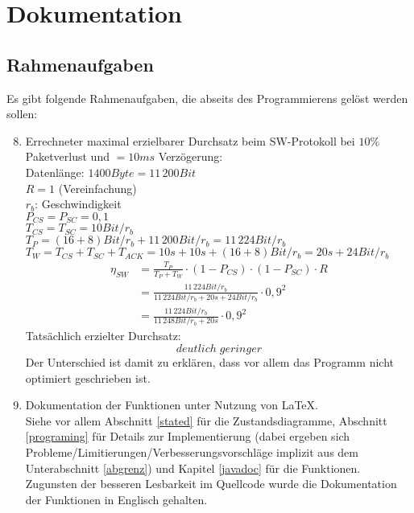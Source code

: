 \maketitle
\newpage
\tableofcontents
\newpage

\chapter{Dokumentation}

\section{Rahmenaufgaben}

Es gibt folgende Rahmenaufgaben, die abseits des Programmierens gelöst werden sollen:
\begin{enumerate}
\setcounter{enumi}{7}
\item Errechneter maximal erzielbarer Durchsatz beim SW-Protokoll bei $10\%$ Paketverlust und $=10\unit{ms}$ Verzögerung:\\
Datenlänge: $1400 \unit{Byte} = 11\,200\unit{Bit}$\\
$R=1$ (Vereinfachung)\\
$r_b$: Geschwindigkeit\\
$P_{CS}=P_{SC}=0,1$\\
$T_{CS}=T_{SC}=10\unit{Bit}/r_b$\\
$T_P=(16+8)\unit{Bit}/r_b+11\,200\unit{Bit}/r_b=11\,224\unit{Bit}/r_b$ \\
$T_W=T_{CS}+T_{SC}+T_{ACK}=10\unit{s}+10\unit{s}+(16+8)\unit{Bit}/r_b=20\unit{s}+24\unit{Bit}/r_b$
\begin{align*}
\eta_{SW}&=\frac{T_P}{T_P+ T_W}\cdot (1-P_{CS})\cdot(1-P_{SC}) \cdot R \\
&= \frac{11\,224\unit{Bit}/r_b}{11\,224\unit{Bit}/r_b+20\unit{s}+24\unit{Bit}/r_b}\cdot 0,9^2\\
&=\frac{11\,224\unit{Bit}/r_b}{11\,248\unit{Bit}/r_b+20\unit{s}}\cdot 0,9^2
\end{align*}
Tatsächlich erzielter Durchsatz:
$$deutlich\;geringer$$
Der Unterschied ist damit zu erklären, dass vor allem das Programm nicht optimiert geschrieben ist.
\item Dokumentation der Funktionen unter Nutzung von \LaTeX{}.\\
Siehe vor allem Abschnitt \ref{stated} für die Zustandsdiagramme, Abschnitt \ref{programing} für Details zur Implementierung (dabei ergeben sich Probleme/Limitierungen/Verbesserungsvorschläge implizit aus dem Unterabschnitt \ref{abgrenz})  und Kapitel \ref{javadoc} für die Funktionen. Zugunsten der besseren Lesbarkeit im Quellcode wurde die Dokumentation der Funktionen in Englisch gehalten.
\end{enumerate}


